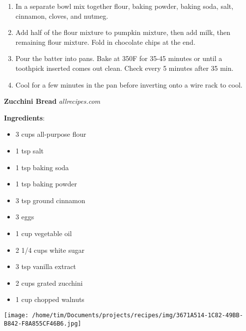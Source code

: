 \documentclass[11pt, twoside, openany]{book}
\begin{document}
\begin{minipage}[t]{\linewidth}
\begin{enumerate}
\item In a separate bowl mix together flour, baking powder, baking soda, salt, cinnamon, cloves, and nutmeg.
\item Add half of the flour mixture to pumpkin mixture, then add milk, then remaining flour mixture. Fold in chocolate chips at the end.
\item Pour the batter into pans. Bake at 350F for 35-45 minutes or until a toothpick inserted comes out clean. Check every 5 minutes after 35 min.
\item Cool for a few minutes in the pan before inverting onto a wire rack to cool.
\end{enumerate}
\end{minipage}\vspace{8mm}
\noindent\begin{minipage}[t]{\linewidth}%
{\Large\textbf{Zucchini Bread}} \label{zucchini-bread}\hfill\textit{allrecipes.com}\\
\noindent\begin{minipage}[t]{0.78\linewidth}%
\textbf{Ingredients}:\vspace{-3mm}
\begin{multicols}{2}
\begin{itemize}\setlength\itemsep{-1mm}
\item 3 cups all-purpose flour
\item 1 tsp salt
\item 1 tsp baking soda
\item 1 tsp baking powder
\item 3 tsp ground cinnamon
\item 3 eggs
\item 1 cup vegetable oil
\item 2 1/4 cups white sugar
\item 3 tsp vanilla extract
\item 2 cups grated zucchini
\item 1 cup chopped walnuts
\end{itemize}
\end{multicols}
\end{minipage}
\noindent\begin{minipage}[t]{0.18\linewidth}
\centering \strut\vspace*{-\baselineskip}\newline
\texttt{[image: /home/tim/Documents/projects/recipes/img/3671A514-1C82-49BB-B842-F8A855CF46B6.jpg]}\\
\end{minipage}\vspace{3mm}

\end{minipage}
\end{document}
